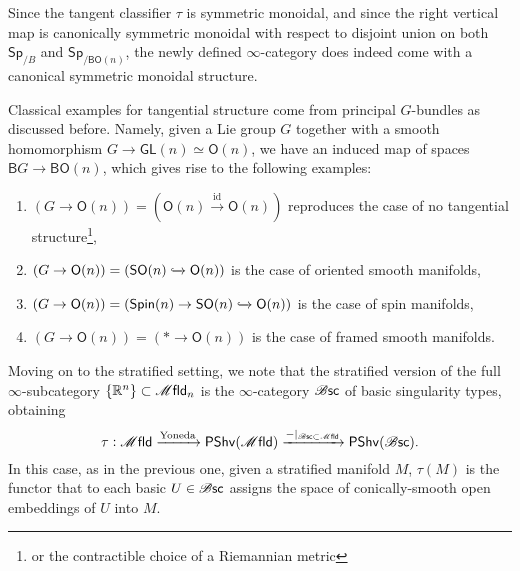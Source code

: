 \documentclass[../text]{subfiles}
\begin{document}
\begin{remark}
    Since the tangent classifier $\tau$ is symmetric monoidal, and since the right vertical map is canonically symmetric monoidal with respect to disjoint union on both $\mathsf{Sp}_{/B}$ and $\mathsf{Sp}_{/\mathsf{BO}(n)}$, the newly defined $\infty$-category does indeed come with a canonical symmetric monoidal structure.
\end{remark}

\begin{example}
    Classical examples for tangential structure come from principal $G$-bundles as discussed before. Namely, given a Lie group $G$ together with a smooth homomorphism $G \rightarrow \mathsf{GL}(n) \simeq \mathsf{O}(n)$, we have an induced map of spaces $\mathsf{B}G \rightarrow \mathsf{BO}(n)$, which gives rise to the following examples:
    \begin{enumerate}
        \item $(G \rightarrow \mathsf{O}(n)) = (\mathsf{O}(n) \xrightarrow{\mathrm{id}} \mathsf{O}(n))$ reproduces the case of no tangential structure\footnote{or the contractible choice of a Riemannian metric},
        \item $(G \rightarrow \mathsf{O}(n)) = (\mathsf{SO}(n) \xhookrightarrow{} \mathsf{O}(n))$ is the case of oriented smooth manifolds,
        \item $(G \rightarrow \mathsf{O}(n)) = (\mathsf{Spin}(n) \rightarrow \mathsf{SO}(n) \xhookrightarrow{} \mathsf{O}(n))$ is the case of spin manifolds,
        \item $(G \rightarrow \mathsf{O}(n)) = (* \rightarrow \mathsf{O}(n))$ is the case of framed smooth manifolds.
    \end{enumerate}
\end{example}

Moving on to the stratified setting, we note that the stratified version of the full $\infty$-subcategory $\{\mathbb{R}^n\} \subset \mfld_n$ is the $\infty$-category $\mathscr{B} \mathsf{sc}$ of basic singularity types, obtaining
%
\begin{equation}
    \tau: \mfld \xrightarrow{\mathrm{Yoneda}} \mathsf{PShv}(\mfld) \xrightarrow{-|_{\bsc \subset \mfld}} \mathsf{PShv}(\bsc).
\end{equation}
%
In this case, as in the previous one, given a stratified manifold $M$, $\tau(M)$ is the functor that to each basic $U \in \mathscr{B} \mathsf{sc}$ assigns the space of conically-smooth open embeddings of $U$ into $M$.
\end{document}
